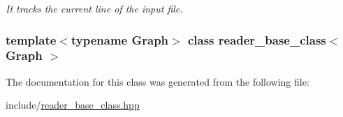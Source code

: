 \begin{DoxyCompactItemize}
\begin{DoxyCompactList}\small\item\em It tracks the current line of the input file. \item\end{DoxyCompactList}\end{DoxyCompactItemize}
\subsubsection*{template$<$typename Graph$>$ class reader\_\-base\_\-class$<$ Graph $>$}



The documentation for this class was generated from the following file:\begin{DoxyCompactItemize}
\item 
include/\hyperlink{reader__base__class_8hpp}{reader\_\-base\_\-class.hpp}\end{DoxyCompactItemize}
